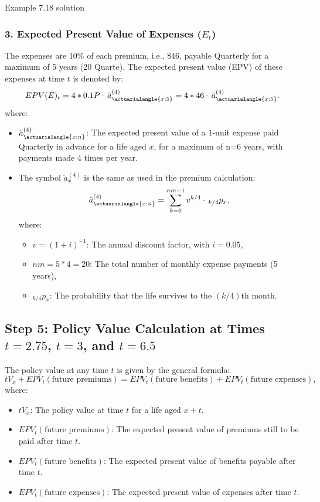 \begin{solve}{}{Example 7.18 solution}
		\subsubsection*{3. Expected Present Value of Expenses (\(E_t\))}
		
		The expenses are 10\% of each premium, i.e., \$46, payable Quarterly for a maximum of 5 years (20 Quarte). The expected present value (EPV) of these expenses at time \(t\) is denoted by:
		\[
		EPV(E)_t = 4 * 0.1P \cdot \, \ddot{a}_{\actuarialangle{x:5}}^{(4)} = 4 * 46 \cdot \, \ddot{a}_{\actuarialangle{x:5}}^{(4)}.
		\]
		where:
		\begin{itemize}
			\item \(\ddot{a}_{\actuarialangle{x:n}}^{(4)}\): The expected present value of a 1-unit expense paid Quarterly in advance for a life aged \(x\), for a maximum of n=6 years, with payments made 4 times per year.
			\item The symbol \(\ddot{a}_{x}^{(4)}\) is the same as used in the premium calculation:
			\[
			\ddot{a}_{\actuarialangle{x:n}}^{(4)} = \sum_{k=0}^{nm-1} v^{k/4} \cdot \, _{k/4}p_x,
			\]
			where:
			\begin{itemize}
				\item \(v = (1+i)^{-1}\): The annual discount factor, with \(i = 0.05\),
				\item \(nm = 5*4 = 20\): The total number of monthly expense payments (5 years),
				\item \(_{k/4}p_x\): The probability that the life survives to the \((k/4)\)th month.
			\end{itemize}
		\end{itemize}
		
		
		\subsection*{Step 5: Policy Value Calculation at Times \(t = 2.75\), \(t = 3\), and \(t = 6.5\)}
		
		The policy value at any time \(t\) is given by the general formula:
		\[
		tV_x + EPV_t(\text{future premiums}) = EPV_t(\text{future benefits}) + EPV_t(\text{future expenses}),
		\]
		where:
		\begin{itemize}
			\item \(tV_x\): The policy value at time \(t\) for a life aged \(x+t\).
			\item \(EPV_t(\text{future premiums})\): The expected present value of premiums still to be paid after time \(t\).
			\item \(EPV_t(\text{future benefits})\): The expected present value of benefits payable after time \(t\).
			\item \(EPV_t(\text{future expenses})\): The expected present value of expenses after time \(t\).
		\end{itemize}
		

\end{solve}

